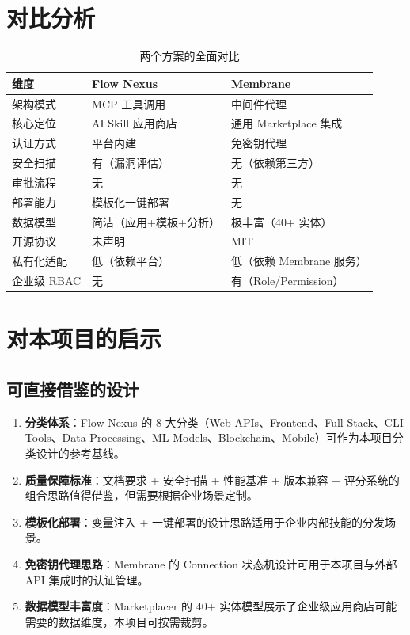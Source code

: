 \documentclass[11pt,a4paper]{article}
\begin{document}
\section{对比分析}

\begin{table}[h]
\centering
\small
\begin{tabular}{p{2.5cm}p{4.5cm}p{4.5cm}}
\toprule
\textbf{维度} & \textbf{Flow Nexus} & \textbf{Membrane} \\
\midrule
架构模式 & MCP 工具调用 & 中间件代理 \\
核心定位 & AI Skill 应用商店 & 通用 Marketplace 集成 \\
认证方式 & 平台内建 & 免密钥代理 \\
安全扫描 & 有（漏洞评估） & 无（依赖第三方） \\
审批流程 & 无 & 无 \\
部署能力 & 模板化一键部署 & 无 \\
数据模型 & 简洁（应用+模板+分析） & 极丰富（40+ 实体） \\
开源协议 & 未声明 & MIT \\
私有化适配 & 低（依赖平台） & 低（依赖 Membrane 服务） \\
企业级 RBAC & 无 & 有（Role/Permission） \\
\bottomrule
\end{tabular}
\caption{两个方案的全面对比}
\end{table}

\section{对本项目的启示}

\subsection{可直接借鉴的设计}

\begin{enumerate}
  \item \textbf{分类体系}：Flow Nexus 的 8 大分类（Web APIs、Frontend、Full-Stack、CLI Tools、Data Processing、ML Models、Blockchain、Mobile）可作为本项目分类设计的参考基线。
  
  \item \textbf{质量保障标准}：文档要求 + 安全扫描 + 性能基准 + 版本兼容 + 评分系统的组合思路值得借鉴，但需要根据企业场景定制。
  
  \item \textbf{模板化部署}：变量注入 + 一键部署的设计思路适用于企业内部技能的分发场景。
  
  \item \textbf{免密钥代理思路}：Membrane 的 Connection 状态机设计可用于本项目与外部 API 集成时的认证管理。
  
  \item \textbf{数据模型丰富度}：Marketplacer 的 40+ 实体模型展示了企业级应用商店可能需要的数据维度，本项目可按需裁剪。
\end{enumerate}
\end{document}
